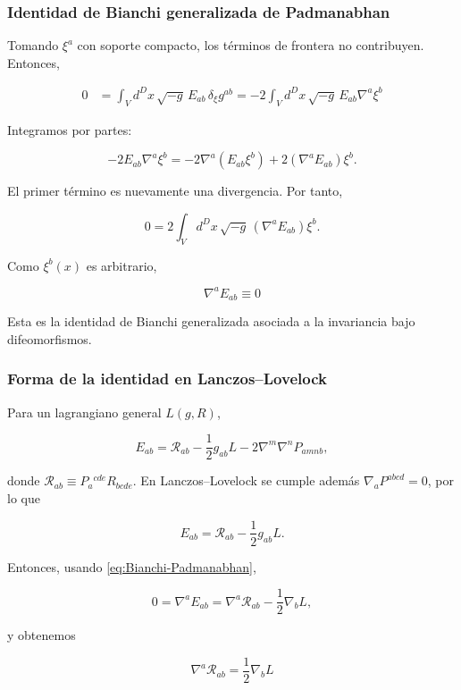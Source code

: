 \documentclass{beamer}
\newcommand{\Eq}[1]{\eqref{#1}}
\begin{document}
\begin{frame}[label=nav-frame-035]
	\frametitle{Identidad de Bianchi generalizada de Padmanabhan}
	\small

	Tomando $\xi^a$ con soporte compacto, los términos de
	frontera no contribuyen. Entonces,

	\begin{align*}
		0
		&=
		\int_V d^Dx\,\sqrt{-g}\,
		E_{ab}\,\delta_\xi g^{ab}
		=
		-2
		\int_V d^Dx\,\sqrt{-g}\,
		E_{ab}\nabla^a\xi^b
	\end{align*}

	Integramos por partes:

	\[
	-2E_{ab}\nabla^a\xi^b
	=
	-2\nabla^a(E_{ab}\xi^b)
	+
	2(\nabla^aE_{ab})\xi^b.
	\]

	El primer término es nuevamente una divergencia. Por tanto,

	\[
	0
	=
	2\int_V d^Dx\,\sqrt{-g}\,
	(\nabla^aE_{ab})\xi^b.
	\]

	Como $\xi^b(x)$ es arbitrario,

	\begin{equation}
		\boxed{
			\nabla^aE_{ab}\equiv0
		}
		\label{eq:Bianchi-Padmanabhan}
	\end{equation}

	Esta es la identidad de Bianchi generalizada asociada
	a la invariancia bajo difeomorfismos.

\end{frame}

\begin{frame}[label=nav-frame-036]
	\frametitle{Forma de la identidad en Lanczos--Lovelock}
	\small

	Para un lagrangiano general $L(g,R)$,

	\[
	E_{ab}
	=
	\mathcal{R}_{ab}
	-\frac12g_{ab}L
	-2\nabla^m\nabla^nP_{amnb},
	\]

	donde $\mathcal{R}_{ab} \equiv P_a{}^{cde}R_{bcde}$. En Lanczos--Lovelock se cumple además $\nabla_aP^{abcd}=0$, por lo que

	\[
	E_{ab}
	=
	\mathcal{R}_{ab}
	-\frac12g_{ab}L.
	\]

	Entonces, usando \Eq{eq:Bianchi-Padmanabhan},

	\[
	0
	=
	\nabla^aE_{ab}
	=
	\nabla^a\mathcal{R}_{ab}
	-\frac12\nabla_bL,
	\]

	y obtenemos

	\begin{equation}
		\boxed{
			\nabla^a\mathcal{R}_{ab}
			=
			\frac12\nabla_bL
		}
		\label{eq:Bianchi-LL-Rcal}
	\end{equation}

\end{frame}
\end{document}
